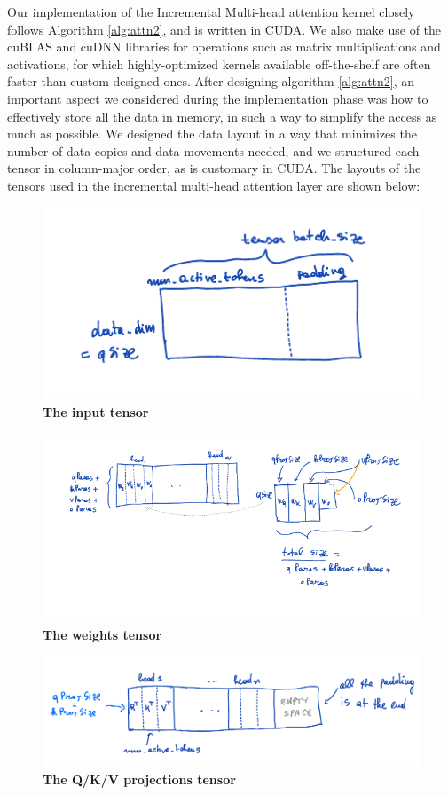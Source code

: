 Our implementation of the Incremental Multi-head attention kernel closely follows Algorithm \ref{alg:attn2}, and is written in CUDA. We also make use of the cuBLAS and cuDNN libraries for operations such as matrix multiplications and activations, for which highly-optimized kernels available off-the-shelf are often faster than custom-designed ones. After designing algorithm \ref{alg:attn2}, an important aspect we considered during the implementation phase was how to effectively store all the data in memory, in such a way to simplify the access as much as possible. We designed the data layout in a way that minimizes the number of data copies and data movements needed, and we structured each tensor in column-major order, as is customary in CUDA. The layouts of the tensors used in the incremental multi-head attention layer are shown below:

\begin{figure}[H]
    \centering
    \includegraphics[width=0.6\linewidth]{figures/input_tensor.png}
    \caption{\textbf{The input tensor}}
    \label{fig:mha-input}
\end{figure}

\begin{figure}[H]
    \centering
    \includegraphics[width=\linewidth]{figures/weights.png}
    \caption{\textbf{The weights tensor}}
    \label{fig:mha-weights}
\end{figure}

\begin{figure}[H]
    \centering
    \includegraphics[width=\linewidth]{figures/qkv_proj.png}
    \caption{\textbf{The Q/K/V projections tensor}}
    \label{fig:mha-qkv-projs}
\end{figure}

